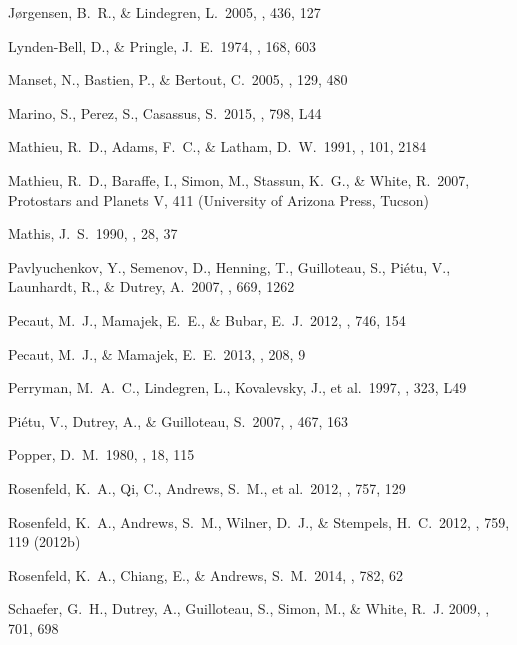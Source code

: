 \documentclass{aastex6}
\begin{document}
\begin{thebibliography}{}
 J{\o}rgensen, B.~R., \& Lindegren, L.\ 2005, \aap, 436, 127

 Lynden-Bell, D., \& Pringle, J.~E.\ 1974, \mnras, 168, 603

 Manset, N., Bastien, P.,
\& Bertout, C.\ 2005, \aj, 129, 480

 Marino, S., Perez, S., Casassus, S.\ 2015, \apj, 798, L44

 Mathieu, R.~D., Adams,
F.~C., \& Latham, D.~W.\ 1991, \aj, 101, 2184

 Mathieu, R.~D.,
Baraffe, I., Simon, M., Stassun, K.~G.,
\& White, R.\ 2007, Protostars and Planets V, 411 (University of Arizona Press, Tucson)

 Mathis, J.~S.\ 1990, \araa, 28, 37

 Pavlyuchenkov, Y., Semenov, D., Henning, T., Guilloteau, S., Pi{\'e}tu, V., Launhardt, R., \& Dutrey, A.\ 2007, \apj, 669, 1262

 Pecaut, M.~J., Mamajek,
E.~E., \& Bubar, E.~J.\ 2012, \apj, 746, 154

 Pecaut, M.~J., \& Mamajek, E.~E.\ 2013, \apjs, 208, 9

 Perryman, M.~A.~C., Lindegren, L., Kovalevsky, J., et al.\ 1997, \aap, 323, L49

 Pi{\'e}tu, V., Dutrey, A., \& Guilloteau, S.\ 2007, \aap, 467, 163

 Popper, D.~M.\ 1980, \araa, 18, 115

 Rosenfeld, K.~A., Qi, C., Andrews, S.~M., et al.\ 2012, \apj, 757, 129

 Rosenfeld, K.~A., Andrews, S.~M., Wilner, D.~J., \& Stempels, H.~C.\ 2012, \apj, 759, 119 (2012b)

 Rosenfeld, K.~A., Chiang, E., \& Andrews, S.~M.\ 2014, \apj, 782, 62

 Schaefer, G.~H., Dutrey, A., Guilloteau, S., Simon, M., \& White, R.~J. 2009, \apj, 701, 698


\end{thebibliography}
\end{document}
